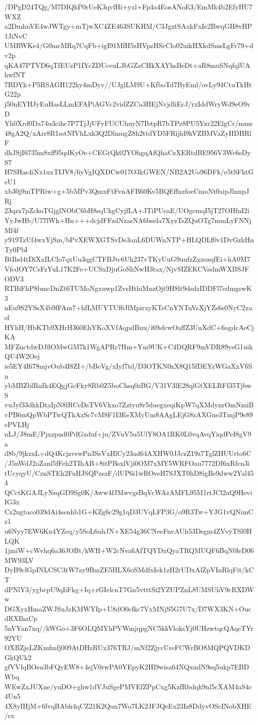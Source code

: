/DPgD24TQg/M7DIQkP0rUeK3qvfHi+yxl+Fp4a4EosANoE3/EmMk4b2EfyHU7WXZ
a2DmhnVE4wJWTgy+mTjwXC4ZE463SUKHM/C3JgztSAxkFxIe2BwqGH8vHP1JiNvC
UMRWKe4/G0mcMRq7CqFb+igI91MfH5zHVpzHScClo02uikHXkdSmsLgFr79+dv2p
qKA47PTVD6qTfEUzP1IYcZDUceuL3bGZaCHkXAYhsBeDt+aR8muSNqfqlUAhwfNT
7BDYk+P5RSAGH122ky4mDyv//UJglLM9U+KfboTd7ByEml/ovLy94CtuTkHtG22p
j50nEYHJyEuHasLLmEFAPiAGVc2vidZZCa3HEjNvjdliEcJ/rxIddWryWd9eO9vD
Yh0Xrd0Da74u3cihc7P7TjJjUFyFUCUhnyN7IbtpR7bTPz8PU5Yxr22ElgCr/mms
48gA2Q/xArr8R1sstNIVhLxk3Q2DlmugZ8h2ttdYD5FRijld9kVZBMVaZyHDHRlF
dhJSjI6735m8xff95qdKyOe+CEGtQk02YOhgqAfQhaCzXERtdBE956V3Wc6sDyS7
H7SHas4iNx1uxTIJV8/6yVgIQXDCw017O3kGWEN/NB2A2Uo96DFk/e5tSFktGeU1
xb30j9mTPRiw+g+5bMPv3QmxFtFvnAFB60Kv5BQEffnzfoeCmoNt0aipJlnnpJRj
23qzx7pZckoTGjglNObC6bH8sqUkgCyjfLA+JTiPUeaE/UOgcmqI5jT27OHfnI2i
YyJwHb/U77lWh+Hn+++dcjdFFzdNzasNA6bsela7XyzTsZQuOTg7mmLyFNNjMf4f
y919TzUf4wxYjSm/bPvXEWXGTSvDe3anL6DUWnNTP+HLQDLf0v1DvGzkHnTy0PbI
BtIhd4tDiXxILClo7qxUu3qgCTFBJtc6Uh237vTKyUuG9uufzZxzozqfEi+hA0M7
VfcdOY7CsFzYuL17K2Fe+UCSxDjuGoShNwH3tax/NjvSIZEKCVsslmWXBSJFODV3
RTBiFhP8bmcDnZt6TUMoNgxuwp1ZvsHthiMnzOjt9H8lt9dsdzIDDFl7edmgswK3
nEu9S2YSsX4b9fFAm7+hfLMUYTUf6JfMpirxyKTsCnYNTnVsXjYZs6s0NyC2xasf
HYhH/HbKTb9XHrH360EhYKoXVfAqpdBuu/i69sfcwOaffZ3UuXdC+6agdcAeCjKA
MFZnctdwDJflOMwGM7k1WgAPRr7Hm+Ym9UK+C4DQRF9mVDR89ysG1uikQU4W2Oej
ie5EY4I678mjvOub4I8ZI+/bBcVg/xIyf7td/D3OTKN0zX8Q15fDEYzWGaXxV6Sn
ybMBZblRuIk4EQgjGcFky8Rb0Z5boChsq0zBG/V31V3lE28qlGtXELRFf35TjbwS
vuJyf33dkkDtaIpN8lRCeDsTV6Vkxo7Zztyu8r5duegxeqiKpW7qXMdynrOmNmiB
vPB6mQpWbPTwQTkAzSc7vM8F1I3EeXMyUm8AAgLEjG8zAXGue3TmjP9s89ePVLHj
nLJ/J8mE/Pjxzpud0PdGxduf+ju/ZVuV5u5UlY8OA1RK0L0vqAvqYiqdPeI8gV9a
d8b/9jkzxL+dQ4KcjzvswPn3SsVxHlCy23ad64AXHW0JJczZ19z7TglZHUUrto6C
/J5nWdJ2oZanl5fFeh2TIhAB+8itPBsxlVji0OM7xMY5WRFOau7772DI6xRfcn3i
tUcyqyU/CznSTEh2FuHJSQPzsaF/dUP6i1wROveH7SJXT0hD8igBe9dww2Yal454
QCctKGAJLyNsqGD9Sg0K/Aww4fJMwvgsBqVcWAzAMFL95M1rtJCl2aQ9HeviIG3x
Cz2ngtaco039dAi4senhb1G+KZg6c29g1qD3UVqLFP3G/o9R3Tw+YJG1vQNimCz1
u6Nyy7EW6Kn4YZeq/y5SoL6uhJN+XE54g36CNeeFnvAUh53Dsgm4ZVvyTSl0HLQK
1jmiW+cWvhq6a36JOBt/kWH+W2cNva6AfTQYDxQyaTRQMUQF6BqN0leD06MW93LV
DyB9clGpINLCSC3tW7ay9BmZE5HLX6oSMdfxIek1zH2rUDxAlZpVInRlqFit/kCT
dPNlY3/ygbcpU9qIiFkg+Iq+rGIelcnT7Gn5vtttSi2YZUPZnL8UMSUhV9cRXDWw
DGXyxHmaZWJSuJzKMWYIp+U8dO0cfkc7VxMNjS5G7U7x/D7WX3KN+OucdRXIhaCp
5nVYan7xq//kWGo+3F6OLQMYhPVWmjqpgNC5kkVloksYj0UHzwtqcQAqcTYr92YU
OXBZjeLZKmfmfj009AtDHzRUx376TRJ/mNf2ZjycUreFCWrBO8MQPQVDKDGkQUk2
gfVVfqBOsu3bFQyEW8+4sjV0rwPA0YEpyK2Hl9wisa64NQxudN9sq5ukp7EBDWbq
WEwZxJUXne/yuDO+ghw1dVJuSgePMVEfZPpCxg5KzfRbdqk9nl5cXAM4aS4c4Un5
4X8yIHjM+6fvqBAbh4qCZ21K2Qun7Wo7LK2JFJQeEx23Iz8DdyvOScINobXHE/rx
